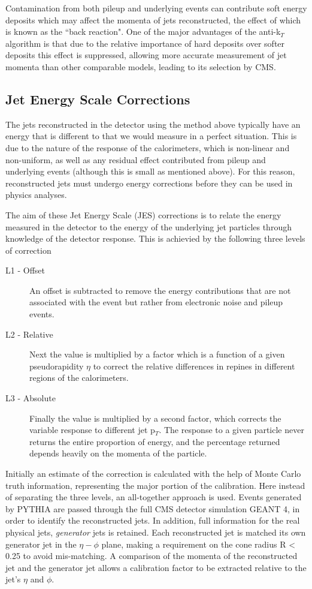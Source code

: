 Contamination from both pileup and underlying events can contribute soft energy deposits which may affect the momenta of jets reconstructed, the effect of which is known as the ``back reaction". One of the major advantages of the anti-k$_{T}$ algorithm is that due to the relative importance of hard deposits over softer deposits this effect is suppressed, allowing more accurate measurement of jet momenta than other comparable models, leading to its selection by CMS.
\subsection{Jet Energy Scale Corrections}
\label{sec:JES}
The jets reconstructed in the detector using the method above typically have an energy that is different to that we would measure in a perfect situation. This is due to the nature of the response of the calorimeters, which is non-linear and non-uniform, as well as any residual effect contributed from pileup and underlying events (although this is small as mentioned above). For this reason, reconstructed jets must undergo energy corrections before they can be used in physics analyses. 

The aim of these Jet Energy Scale (JES) corrections is to relate the energy measured in the detector to the energy of the underlying jet particles through knowledge of the detector response. This is achievied by the following three levels of correction 

\begin{description}
\item[L1 - Offset]{An offset is subtracted to remove the energy contributions that are not associated with the event but rather from electronic noise and pileup events.  }
\item[L2 - Relative]{Next the value is multiplied by a factor which is a function of a given pseudorapidity $\eta$ to correct the relative differences in repines in different regions of the calorimeters.}
\item [L3 - Absolute]{Finally the value is multiplied by a second factor, which corrects the variable response to different jet p$_{T}$. The response to a given particle never returns the entire proportion of energy, and the percentage returned depends heavily on the momenta of the particle.}
\end{description}



Initially an estimate of the correction is calculated with the help of Monte Carlo truth information, representing the major portion of the calibration. Here instead of separating the three levels, an all-together approach is used. Events generated by \textsc{PYTHIA} are passed through the full CMS detector simulation \textsc{GEANT 4}, in order to identify the reconstructed jets. In addition, full information for the real physical jets, \textit{generator} jets is retained. Each reconstructed jet is matched its own generator jet in the $\eta - \phi$ plane, making a requirement on the cone radius R < 0.25 to avoid mis-matching. A comparison of the momenta of the reconstructed jet and the generator jet allows a calibration factor to be extracted relative to the jet's $\eta$ and $\phi$. 

